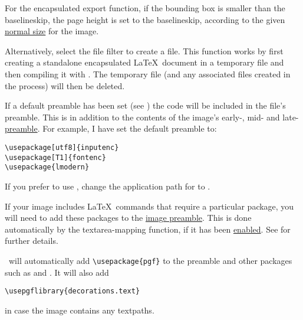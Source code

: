 \begin{information}
For the encapsulated export function,
if the bounding box is smaller than the baselineskip, the page
height is set to the baselineskip, according to the given
\hyperref[sec:normalsize]{normal size} for the image.
\end{information}

Alternatively, select the  file filter to create
a  file.  This function works by first creating a
standalone encapsulated \LaTeX\ document in a temporary file and
then compiling it with . The temporary file (and any
associated files created in the process) will then be deleted.

If a default preamble has been set (see
) the code will be included in the
 file's preamble.  This is in
addition to the contents of the image's early-, mid- and
late-\hyperref[sec:preamble]{preamble}. For example, I have set the
default preamble to:
\begin{verbatim}
\usepackage[utf8]{inputenc}
\usepackage[T1]{fontenc}
\usepackage{lmodern}
\end{verbatim}
If you prefer to use , change the application path for
 to .

If your image includes \LaTeX\ commands that require a particular
package, you will need to add these packages to the
\hyperref[sec:preamble]{image preamble}. This is done automatically
by the \gls{textarea-mapping} function, if it has been
\hyperref[mi:texmappings]{enabled}.  See
 for further details.

\FlowframTk\ will automatically add
\verb|\usepackage{pgf}| to the preamble and other packages such as
 and . It will also add
\begin{verbatim}
\usepgflibrary{decorations.text}
\end{verbatim}
in case the image contains any \glspl{textpath}.


